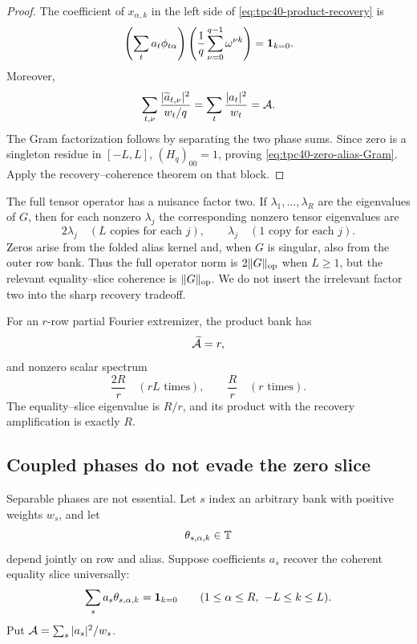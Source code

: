 \begin{proof}
The coefficient of \(x_{\alpha,k}\) in the left side of
\eqref{eq:tpc40-product-recovery} is
\[
 \left(\sum_ta_t\phi_{t\alpha}\right)
 \left(\frac1q\sum_{\nu=0}^{q-1}\omega^{\nu k}\right)
 =\mathbf 1_{k=0}.
\]
Moreover,
\[
 \sum_{t,\nu}
 \frac{|\widetilde a_{t,\nu}|^2}{w_t/q}
 =\sum_t\frac{|a_t|^2}{w_t}=\mathcal A.
\]
The Gram factorization follows by separating the two phase sums.  Since
zero is a singleton residue in \([-L,L]\), \((H_q)_{00}=1\), proving
\eqref{eq:tpc40-zero-alias-Gram}.  Apply the recovery--coherence theorem
on that block.
\end{proof}

The full tensor operator has a nuisance factor two.  If
\(\lambda_1,\ldots,\lambda_R\) are the eigenvalues of \(G\), then for
each nonzero \(\lambda_j\) the corresponding nonzero tensor eigenvalues are
\begin{equation}
 2\lambda_j\quad(L\text{ copies for each }j),
 \qquad
 \lambda_j\quad(1\text{ copy for each }j).
 \label{eq:tpc40-product-spectrum}
\end{equation}
Zeros arise from the folded alias kernel and, when \(G\) is singular, also
from the outer row bank.  Thus the full operator norm is
\(2\|G\|_{\operatorname{op}}\) when \(L\ge1\), but the relevant
equality--slice coherence is \(\|G\|_{\operatorname{op}}\).  We do not insert the
irrelevant factor two into the sharp recovery tradeoff.

\begin{corollary}
\label{cor:tpc40-partial-Fourier-tensor}
For an \(r\)-row partial Fourier extremizer, the product bank has
\begin{equation}
 \widetilde{\mathcal A}=r,
 \label{eq:tpc40-partial-tensor-A}
\end{equation}
and nonzero scalar spectrum
\begin{equation}
 \frac{2R}{r}\quad(rL\text{ times}),
 \qquad
 \frac{R}{r}\quad(r\text{ times}).
 \label{eq:tpc40-partial-tensor-spectrum}
\end{equation}
The equality--slice eigenvalue is \(R/r\), and its product with the
recovery amplification is exactly \(R\).
\end{corollary}

\subsection{Coupled phases do not evade the zero slice}

Separable phases are not essential.  Let \(s\) index an arbitrary bank
with positive weights \(w_s\), and let
\begin{equation}
 \theta_{s,\alpha,k}\in\mathbb T
 \label{eq:tpc40-coupled-phase}
\end{equation}
depend jointly on row and alias.  Suppose coefficients \(a_s\) recover
the coherent equality slice universally:
\begin{equation}
 \sum_sa_s\theta_{s,\alpha,k}=\mathbf 1_{k=0}
 \qquad
 (1\le\alpha\le R,\ -L\le k\le L).
 \label{eq:tpc40-coupled-recovery}
\end{equation}
Put \(\mathcal A=\sum_s|a_s|^2/w_s\).

